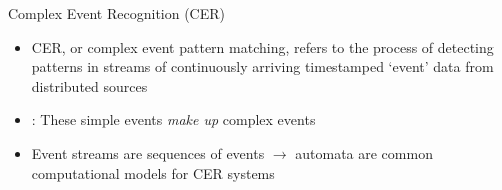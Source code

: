 \documentclass[10pt, aspectratio=169]{beamer}
\begin{document}
\begin{frame}{Complex Event Recognition (CER)}
    \begin{itemize}
        \setlength{\itemsep}{17pt}
        \item CER, or complex event pattern matching, refers to the process of detecting patterns in streams of continuously arriving timestamped `event' data from distributed sources
        \item {}: These \textcolor{umBlueLighter}{simple events} \textit{make up} \textcolor{umBlueLighter}{complex events}
        \item Event streams are sequences of events $\rightarrow$ automata are common computational models for CER systems
    \end{itemize}
\end{frame}
\end{document}

